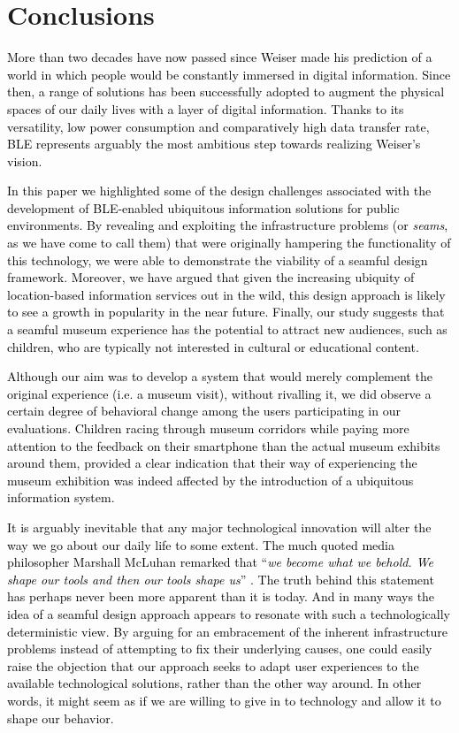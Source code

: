 \documentclass[prodmode,acmtomm]{acmsmall}
\begin{document}
\section{Conclusions} 
\textcolor{black}{More than two decades have now passed since Weiser made his prediction of a world in which people would be constantly immersed in digital information. \cite{weiser1993} Since then, a range of solutions has been successfully adopted to augment the physical spaces of our daily lives with a layer of digital information. Thanks to its versatility, low power consumption and comparatively high data transfer rate, BLE represents arguably the most ambitious step towards realizing Weiser's vision.} 

\textcolor{black}{In this paper we highlighted some of the design challenges associated with the development of BLE-enabled ubiquitous information solutions for public environments. \textcolor{black}{By revealing and exploiting the infrastructure problems (or \textit{seams}, as we have come to call them) that were originally hampering the functionality of this technology, we were able to demonstrate the viability of a seamful design framework. Moreover, we have argued that given the increasing ubiquity of location-based information services out in the wild, this design approach is likely to see a growth in popularity in the near future. Finally, our study suggests that a seamful museum experience has the potential to attract new audiences, such as children, who are typically not interested in cultural or educational content. }}



\textcolor{black}{Although our aim was to develop a system that would merely complement the original experience (i.e. a museum visit), without rivalling it, we did observe a certain degree of behavioral change among the users participating in our evaluations. Children racing through museum corridors while paying more attention to the feedback on their smartphone than the actual museum exhibits around them, provided a clear indication that their way of experiencing the museum exhibition was indeed affected by the introduction of a ubiquitous information system.}

\textcolor{black}{It is arguably inevitable that any major technological innovation will alter the way we go about our daily life to some extent. The much quoted media philosopher Marshall McLuhan remarked that “\textit{we become what we behold. We shape our tools and then our tools shape us}” \cite{mcluhan1964}. The truth behind this statement has perhaps never been more apparent than it is today. And in many ways the idea of a seamful design approach appears to resonate with such a technologically deterministic view. By arguing for an embracement of the inherent infrastructure problems instead of attempting to fix their underlying causes, one could easily raise the objection that our approach seeks to adapt user experiences to the available technological solutions, rather than the other way around. In other words, it might seem as if we are willing to give in to technology and allow it to shape our behavior.}
\end{document}
